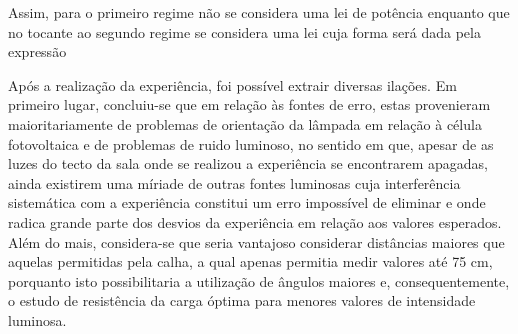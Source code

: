 \documentclass[9pt]{extarticle}
\begin{document}
\begin{multicols}{2}
\par Assim, para o primeiro regime não se considera uma lei de potência enquanto que no tocante ao segundo regime se considera uma lei cuja forma será dada pela expressão 

\par Após a realização da experiência, foi possível extrair diversas ilações. Em primeiro lugar, concluiu-se que em relação às fontes de erro, estas provenieram maioritariamente de problemas de orientação da lâmpada em relação à célula fotovoltaica e de problemas de ruido luminoso, no sentido em que, apesar de as luzes do tecto da sala onde se realizou a experiência se encontrarem apagadas, ainda existirem uma míriade de outras fontes luminosas cuja interferência sistemática com a experiência constitui um erro impossível de eliminar e onde radica grande parte dos desvios da experiência em relação aos valores esperados. Além do mais, considera-se que seria vantajoso considerar distâncias maiores que aquelas permitidas pela calha, a qual apenas permitia medir valores até 75 cm, porquanto isto possibilitaria a utilização de ângulos maiores e, consequentemente, o estudo de resistência da carga óptima para menores valores de intensidade luminosa. 

\vfill

\pagebreak

%

\end{multicols}
\end{document}
